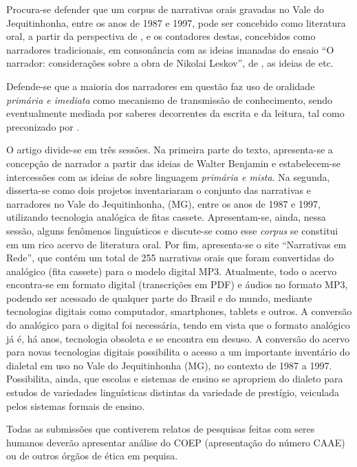 \documentclass[portuguese]{textolivre}
\begin{document}
Procura-se defender que um corpus de narrativas orais gravadas no Vale do Jequitinhonha, entre os anos de 1987 e 1997, pode ser concebido como literatura oral, a partir da perspectiva de \textcite{Cascudo1984}, e os contadores destas, concebidos como narradores tradicionais, em consonância com as ideias imanadas do ensaio “O narrador: considerações sobre a obra de Nikolai Leskov”, de \textcite{Benjamin1985}, as ideias de \textcite{Zumthor1993,Busatto2013,Pereira1996} etc.
    
Defende-se que a maioria dos narradores em questão faz uso de oralidade \textit{primária e imediata} como mecanismo de transmissão de conhecimento, sendo eventualmente mediada por saberes decorrentes da escrita e da leitura, tal como preconizado por \textcite{Zumthor1993}.
    
O artigo divide-se em três sessões. Na primeira parte do texto, apresenta-se a concepção de narrador a partir das ideias de Walter Benjamin e estabelecem-se intercessões com as ideias de \textcite{Zumthor1993} sobre linguagem \textit{primária e mista}. Na segunda, disserta-se como dois projetos inventariaram o conjunto das narrativas e narradores no Vale do Jequitinhonha, (MG), entre os anos de 1987 e 1997, utilizando tecnologia analógica de fitas cassete. Apresentam-se, ainda, nessa sessão, alguns fenômenos linguísticos e discute-se como esse \textit{corpus} se constitui em um rico acervo de literatura oral. Por fim, apresenta-se o site “Narrativas em Rede”, que contém um total de 255 narrativas orais que foram convertidas do analógico (fita cassete) para o modelo digital MP3. Atualmente, todo o acervo encontra-se em formato digital (transcrições em PDF) e áudios no formato MP3, podendo ser acessado de qualquer parte do Brasil e do mundo, mediante tecnologias digitais como computador, smartphones, tablets e outros. A conversão do analógico para o digital foi necessária, tendo em vista que o formato analógico já é, há anos, tecnologia obsoleta e se encontra em desuso. A conversão do acervo para novas tecnologias digitais possibilita o acesso a um importante inventário do dialetal em uso no Vale do Jequitinhonha (MG), no contexto de 1987 a 1997. Possibilita, ainda, que escolas e sistemas de ensino se apropriem do dialeto para estudos de variedades linguísticas distintas da variedade de prestígio, veiculada pelos sistemas formais de ensino.

Todas as submissões que contiverem relatos de pesquisas feitas com seres humanos deverão apresentar análise do COEP (apresentação do número CAAE) ou de outros órgãos de ética em pequisa.
\end{document}
